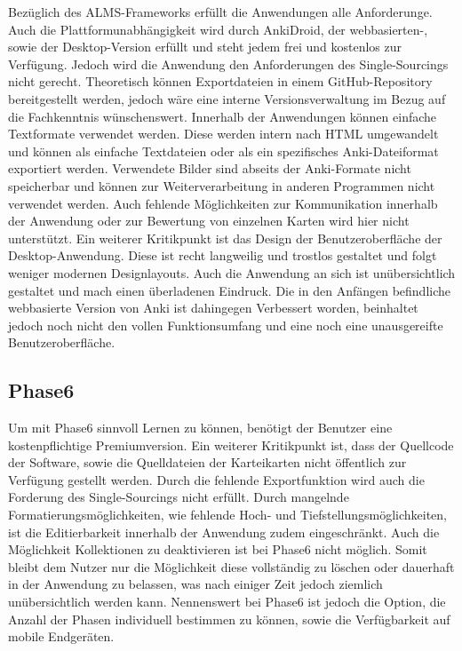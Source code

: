 Bezüglich des ALMS-Frameworks erfüllt die Anwendungen alle Anforderunge. Auch die Plattformunabhängigkeit wird durch AnkiDroid, der webbasierten-, sowie der Desktop-Version erfüllt und steht jedem frei und kostenlos zur Verfügung.
Jedoch wird die Anwendung den Anforderungen des Single-Sourcings nicht gerecht. Theoretisch können Exportdateien in einem GitHub-Repository bereitgestellt werden, jedoch wäre eine interne Versionsverwaltung im Bezug auf die Fachkenntnis wünschenswert. Innerhalb der Anwendungen können einfache Textformate verwendet werden. Diese werden intern nach HTML umgewandelt und können als einfache Textdateien oder als ein spezifisches Anki-Dateiformat exportiert werden. Verwendete Bilder sind abseits der Anki-Formate nicht speicherbar und können zur Weiterverarbeitung in anderen Programmen nicht verwendet werden. Auch fehlende Möglichkeiten zur Kommunikation innerhalb der Anwendung oder zur Bewertung von einzelnen Karten wird hier nicht unterstützt.
Ein weiterer Kritikpunkt ist das Design der Benutzeroberfläche der Desktop-Anwendung. Diese ist recht langweilig und trostlos gestaltet und folgt weniger modernen Designlayouts. 
Auch die Anwendung an sich ist unübersichtlich gestaltet und mach einen überladenen Eindruck. Die in den Anfängen befindliche webbasierte Version von Anki ist dahingegen Verbessert worden, beinhaltet jedoch noch nicht den vollen Funktionsumfang und eine noch eine unausgereifte Benutzeroberfläche. \\


\subsection{Phase6}
Um mit Phase6 \cite{phase6} sinnvoll Lernen zu können, benötigt der Benutzer eine kostenpflichtige Premiumversion. Ein weiterer Kritikpunkt ist, dass der Quellcode der Software, sowie die Quelldateien der Karteikarten nicht öffentlich zur Verfügung gestellt werden. Durch die fehlende Exportfunktion wird auch die Forderung des Single-Sourcings nicht erfüllt. Durch mangelnde Formatierungsmöglichkeiten, wie fehlende Hoch- und Tiefstellungsmöglichkeiten, ist die Editierbarkeit innerhalb der Anwendung zudem eingeschränkt.
Auch die Möglichkeit Kollektionen zu deaktivieren ist bei Phase6 nicht möglich. Somit bleibt dem Nutzer nur die Möglichkeit diese vollständig zu löschen oder dauerhaft in der Anwendung zu belassen, was nach einiger Zeit jedoch ziemlich unübersichtlich werden kann. Nennenswert bei Phase6 ist jedoch die Option, die Anzahl der Phasen individuell bestimmen zu können, sowie die Verfügbarkeit auf mobile Endgeräten.\\


